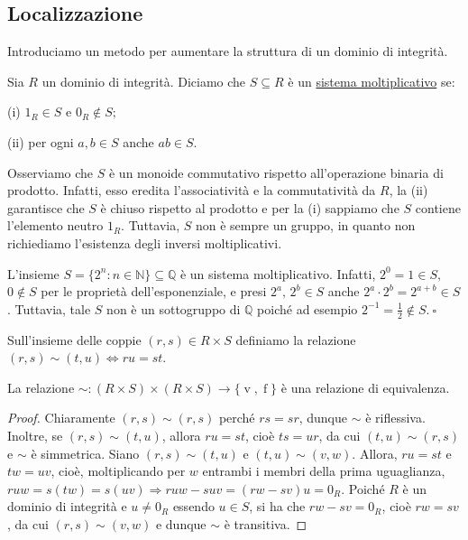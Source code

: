 \subsection{Localizzazione}

\noindent Introduciamo un metodo per aumentare la struttura di un dominio di integrità.

\begin{defn}[]{}
Sia $R$ un dominio di integrità. Diciamo che $S\subseteq R$ è un \underline{sistema moltiplicativo} se:

\noindent (i) $1_R\in S$ e $0_R\not\in S;$

\noindent (ii) per ogni $a,b\in S$ anche $ab\in S$.
\end{defn}

\noindent Osserviamo che $S$ è un monoide commutativo rispetto all'operazione binaria di prodotto. Infatti, esso eredita l'associatività e la commutatività da $R$, la (ii) garantisce che $S$ è chiuso rispetto al prodotto e per la (i) sappiamo che $S$ contiene l'elemento neutro $1_R$. Tuttavia, $S$ non è sempre un gruppo, in quanto non richiediamo l'esistenza degli inversi moltiplicativi.

\begin{exm}L'insieme $S=\{2^n : n\in \mathbb{N}\}\subseteq \mathbb{Q}$ è un sistema moltiplicativo. Infatti, $2^0=1\in S,$ $0\not\in S$ per le proprietà dell'esponenziale, e presi $2^a,\,2^b \in S$ anche $2^a\cdot 2^b=2^{a+b}\in S$. Tuttavia, tale $S$ non è un sottogruppo di $\mathbb{Q}$ poiché ad esempio $2^{-1}=\frac{1}{2}\not\in S. \ \square$\end{exm}

\noindent Sull'insieme delle coppie $(r,s)\in R\times S$ definiamo la relazione $(r,s)\sim (t,u)\Leftrightarrow ru=st$.

\begin{prop}[1.7.1]{}
La relazione $\sim\colon (R\times S)\times (R\times S)\to \{\operatorname{v},\operatorname{f}\}$ è una relazione di equivalenza.\footnotemark
\end{prop}
\vspace{-4mm}
\begin{proof}
Chiaramente $(r,s)\sim (r,s)$ perché $rs=sr$, dunque $\sim$ è riflessiva. Inoltre, se $(r,s)\sim (t,u)$, allora $ru=st$, cioè $ts=ur$, da cui $(t,u)\sim (r,s)$ e $\sim$ è simmetrica. Siano $(r,s)\sim (t,u)$ e $(t,u)\sim (v,w)$. Allora, $ru=st$ e $tw=uv$, cioè, moltiplicando per $w$ entrambi i membri della prima uguaglianza, $ruw=s(tw)=s(uv) \Rightarrow ruw-suv=(rw-sv)u=0_R$. Poiché $R$ è un dominio di integrità e $u\neq 0_R$ essendo $u\in S$, si ha che $rw-sv=0_R$, cioè $rw=sv$, da cui $(r,s)\sim (v,w)$ e dunque $\sim$ è transitiva.
\end{proof}

